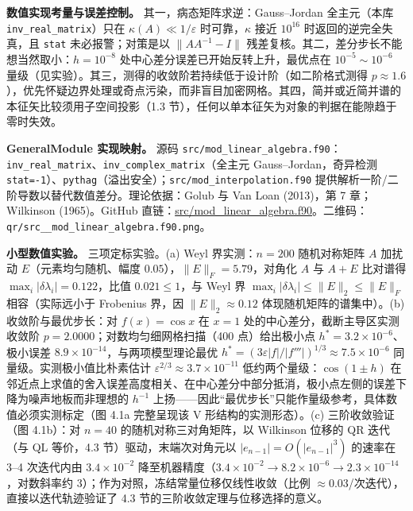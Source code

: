 \documentclass[
]{ctexbook}
\begin{document}
\textbf{数值实现考量与误差控制。} 其一，病态矩阵求逆：Gauss--Jordan
全主元（本库 \texttt{inv\_real\_matrix}）只在
\(\kappa(A)\ll1/\varepsilon\) 时可靠，\(\kappa\) 接近 \(10^{16}\)
时返回的逆完全失真，且 \texttt{stat} 未必报警；对策是以
\(\|A A^{-1}-I\|\) 残差复核。其二，差分步长不能想当然取小：\(h=10^{-8}\)
处中心差分误差已开始反转上升，最优点在 \(10^{-5}\sim10^{-6}\)
量级（见实验）。其三，测得的收敛阶若持续低于设计阶（如二阶格式测得
\(p\approx1.6\)），优先怀疑边界处理或奇点污染，而非盲目加密网格。其四，简并或近简并谱的本征矢比较须用子空间投影（1.3
节），任何以单本征矢为对象的判据在能隙趋于零时失效。

\textbf{GeneralModule 实现映射。} 源码
\texttt{src/mod\_linear\_algebra.f90}：\texttt{inv\_real\_matrix}、\texttt{inv\_complex\_matrix}（全主元
Gauss--Jordan，奇异检测
\texttt{stat=-1}）、\texttt{pythag}（溢出安全）；\texttt{src/mod\_interpolation.f90}
提供解析一阶/二阶导数以替代数值差分。理论依据：Golub 与 Van Loan
(2013)，第 7 章；Wilkinson (1965)。GitHub
直链：\href{https://github.com/l1Ha/QuantumGeneralModule/blob/main/src/mod_linear_algebra.f90}{src/mod\_linear\_algebra.f90}。二维码：\texttt{qr/src\_\_mod\_linear\_algebra.f90.png}。

\textbf{小型数值实验。} 三项定标实验。(a) Weyl 界实测：\(n=200\)
随机对称矩阵 \(A\) 加扰动 \(E\)（元素均匀随机、幅度
\(0.05\)），\(\|E\|_{F}=5.79\)，对角化 \(A\) 与 \(A+E\) 比对谱得
\(\max_i|\delta\lambda_i|=0.122\)，比值 \(0.021\le1\)，与 Weyl 界
\(\max_i|\delta\lambda_i|\le\|E\|_2\le\|E\|_F\) 相容（实际远小于
Frobenius 界，因 \(\|E\|_2\approx0.12\) 体现随机矩阵的谱集中）。(b)
收敛阶与最优步长：对 \(f(x)=\cos x\) 在 \(x=1\)
处的中心差分，截断主导区实测收敛阶 \(p=2.0000\)；对数均匀细网格扫描（400
点）给出极小点 \(h^{*}=3.2\times10^{-6}\)、极小误差
\(8.9\times10^{-14}\)，与两项模型理论最优
\(h^{*}=(3\varepsilon|f|/|f'''|)^{1/3}\approx7.5\times10^{-6}\)
同量级。实测极小值比朴素估计
\(\varepsilon^{2/3}\approx3.7\times10^{-11}\)
低约两个量级：\(\cos(1\pm h)\)
在邻近点上求值的舍入误差高度相关、在中心差分中部分抵消，极小点左侧的误差下降为噪声地板而非理想的
\(h^{-1}\)
上扬------因此``最优步长''只能作量级参考，具体数值必须实测标定（图 4.1a
完整呈现该 V 形结构的实测形态）。(c) 三阶收敛验证（图 4.1b）：对
\(n=40\) 的随机对称三对角矩阵，以 Wilkinson 位移的 QR 迭代（与 QL
等价，4.3 节）驱动，末端次对角元以 \(|e_{n-1}|=O(|e_{n-1}|^{3})\)
的速率在 3--4 次迭代内由 \(3.4\times10^{-2}\)
降至机器精度（\(3.4\times10^{-2}\to8.2\times10^{-6}\to2.3\times10^{-14}\)，对数斜率约
3）；作为对照，冻结常量位移仅线性收敛（比例
\(\approx0.03\)/次迭代），直接以迭代轨迹验证了 4.3
节的三阶收敛定理与位移选择的意义。
\end{document}
